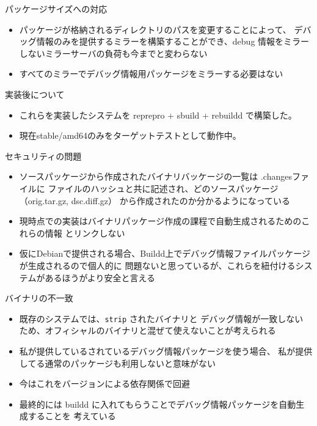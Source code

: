 \begin{frame}[containsverbatim]{パッケージサイズへの対応}
\begin{itemize}[<+->]
\item  パッケージが格納されるディレクトリのパスを変更することによって、
デバッグ情報のみを提供するミラーを構築することができ、debug 情報をミラーしないミラーサーバの負荷も今までと変わらない
\item すべてのミラーでデバッグ情報用パッケージをミラーする必要はない
\end{itemize}
\end{frame}

\begin{frame}{実装後について}

\begin{itemize}
\item これらを実装したシステムを reprepro + sbuild + rebuildd で構築した。
\item 現在stable/amd64のみをターゲットテストとして動作中。
\end{itemize}

\end{frame}


\begin{frame}{セキュリティの問題}
\begin{itemize}[<+->]
\item ソースパッケージから作成されたバイナリバッケージの一覧は .changesファイルに
ファイルのハッシュと共に記述され、どのソースパッケージ（orig.tar.gz, dsc.diff.gz）
から作成されたのか分かるようになっている
\item 現時点での実装はバイナリパッケージ作成の課程で自動生成されるためのこれらの情報
とリンクしない
\item 仮にDebianで提供される場合、Buildd上でデバッグ情報ファイルパッケージが生成されるので個人的に
問題ないと思っているが、これらを紐付けるシステムがあるほうがより安全と言える
\end{itemize}

\end{frame}

\begin{frame}{バイナリの不一致}
\begin{itemize}[<+->]
\item 既存のシステムでは、\texttt{strip} されたバイナリと デバッグ情報が一致しない
ため、オフィシャルのバイナリと混ぜて使えないことが考えられる
\item 私が提供しているされているデバッグ情報パッケージを使う場合、
私が提供してる通常のパッケージも利用しないと意味がない
\item 今はこれをバージョンによる依存関係で回避
\item 最終的には buildd に入れてもらうことでデバッグ情報パッケージを自動生成することを
考えている
\end{itemize}

\end{frame}

